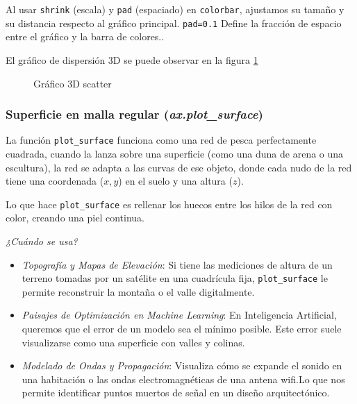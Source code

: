 \begin{nota}
    Al usar \texttt{shrink} (escala) y \texttt{pad} (espaciado) en \texttt{colorbar}, ajustamos su tamaño y su distancia respecto al gráfico principal. \texttt{pad=0.1} Define la fracción de espacio entre el gráfico y la barra de colores..
\end{nota}

El gráfico de dispersión 3D se puede observar en la figura \ref{fig:grafico_3D_scatter}

\begin{figure}[ht]
    \centering
     
    \caption{Gráfico 3D scatter}
    \label{fig:grafico_3D_scatter}
\end{figure}

\subsubsection{Superficie en malla regular (\textit{ax.plot\_surface})}

La función \texttt{plot\_surface} funciona como una red de pesca perfectamente cuadrada, cuando la lanza sobre una superficie (como una duna de arena o una escultura), la red se adapta a las curvas de ese objeto, donde cada nudo de la red tiene una coordenada (\(x,y\)) en el suelo y una altura (\(z\)).

Lo que hace \texttt{plot\_surface} es rellenar los huecos entre los hilos de la red con color, creando una piel continua.


\emph{¿Cuándo se usa?}
\begin{itemize}
    \item \textit{Topografía y Mapas de Elevación}: Si tiene las mediciones de altura de un terreno tomadas por un satélite en una cuadrícula fija, \texttt{plot\_surface} le permite reconstruir la montaña o el valle digitalmente.
    \item \textit{Paisajes de Optimización en Machine Learning}: En Inteligencia Artificial, queremos que el error de un modelo sea el mínimo posible. Este error suele visualizarse como una superficie con valles y colinas.
    \item \textit{Modelado de Ondas y Propagación}: Visualiza cómo se expande el sonido en una habitación o las ondas electromagnéticas de una antena wifi.Lo que nos permite identificar puntos muertos de señal en un diseño arquitectónico.
\end{itemize}

